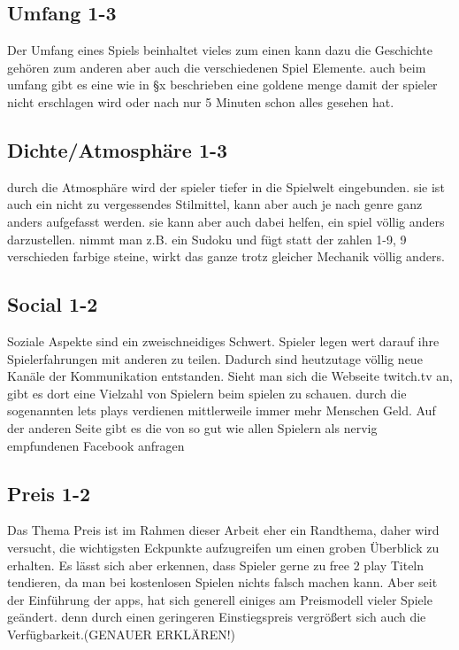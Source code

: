 \subsection{Umfang 1-3} 

Der Umfang eines Spiels beinhaltet vieles zum einen kann dazu die Geschichte gehören zum anderen aber auch die verschiedenen Spiel Elemente. auch beim umfang gibt es eine wie in §x beschrieben eine goldene menge damit der spieler nicht erschlagen wird oder nach nur 5 Minuten schon alles gesehen hat.

\subsection{Dichte/Atmosphäre 1-3} 

durch die Atmosphäre wird der spieler tiefer in die Spielwelt eingebunden. sie ist auch ein nicht zu vergessendes Stilmittel, kann aber auch je nach genre ganz anders aufgefasst werden. sie kann aber auch dabei helfen, ein spiel völlig anders darzustellen. nimmt man z.B. ein Sudoku und fügt statt der zahlen 1-9, 9 verschieden farbige steine, wirkt das ganze trotz gleicher Mechanik völlig anders.

\subsection{Social 1-2} 

Soziale Aspekte sind ein zweischneidiges Schwert. Spieler legen wert darauf ihre Spielerfahrungen mit anderen zu teilen. Dadurch sind heutzutage völlig neue Kanäle der Kommunikation entstanden. Sieht man sich die Webseite twitch.tv an, gibt es dort eine Vielzahl von Spielern beim spielen zu schauen. durch die sogenannten lets plays verdienen mittlerweile immer mehr Menschen Geld. Auf der anderen Seite gibt es die von so gut wie allen Spielern als nervig empfundenen Facebook anfragen

\subsection{Preis 1-2} 

Das Thema Preis ist im Rahmen dieser Arbeit eher ein Randthema, daher wird versucht, die wichtigsten Eckpunkte aufzugreifen um einen groben Überblick zu erhalten. Es lässt sich aber erkennen, dass Spieler gerne zu free 2 play Titeln tendieren, da man bei kostenlosen Spielen nichts falsch machen kann. Aber seit der Einführung der apps, hat sich generell einiges am Preismodell vieler Spiele geändert. denn durch einen geringeren Einstiegspreis vergrößert sich auch die Verfügbarkeit.(GENAUER ERKLÄREN!)

